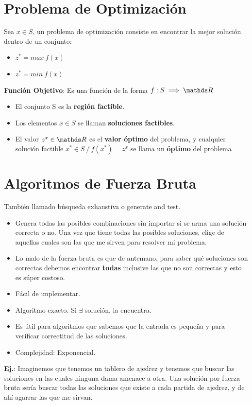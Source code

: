 \documentclass[10pt,a4paper]{article}
\begin{document}
\section*{Problema de Optimización}
Sea $x \in S$, un problema de optimización consiste en encontrar la mejor solución dentro de un conjunto: 
\begin{itemize}
    \item $z^{*} = max \ f(x)$
    \item $z^{*} = min \ f(x)$
\end{itemize}
\textbf{Función Objetivo}: Es una función de la forma $f:S\implies \float$
\begin{itemize}
    \item El conjunto S es la \textbf{región factible}.
    \item Los elementos $x \in S$ se llaman \textbf{soluciones factibles}.
    \item El valor $z^{x} \in \float$ es el \textbf{valor óptimo} del problema, y cualquier solución factible $x^{*} \in S \ / \ f(x^{*}) = z^{x}$ se llama un \textbf{óptimo} del problema
\end{itemize}
\section*{Algoritmos de Fuerza Bruta}
También llamado búsqueda exhaustiva o generate and test. 
\begin{itemize}
    \item Genera todas las posibles combinaciones sin importar si se arma una solución correcta o no. Una vez que tiene todas las posibles soluciones, elige de aquellas cuales son las que me sirven para resolver mi problema. 
    \item Lo malo de la fuerza bruta es que de antemano, para saber qué soluciones son correctas debemos encontrar \textbf{todas} inclusive las que no son correctas y esto es súper costoso.
    \item Fácil de implementar.
    \item Algoritmo exacto. Si $\exists$ solución, la encuentra.
    \item Es útil para algoritmos que sabemos que la entrada es pequeña y para verificar correctitud de las soluciones.
    \item Complejidad: Exponencial. 
\end{itemize}

\textbf{Ej.}: Imaginemos que tenemos un tablero de ajedrez y tenemos que buscar las soluciones en las cuales ninguna dama amenace a otra. Una solución por fuerza bruta sería buscar todas las soluciones que existe a cada partida de ajedrez, y de ahí agarrar las que me sirvan. \\ 
\end{document}
